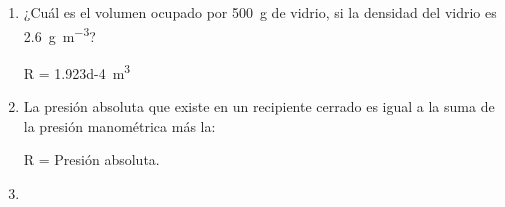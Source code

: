 \documentclass[14pt]{extarticle}
\begin{document}
\begin{enumerate}
R = 1) - c), 2) - b), 3) - d)

\item ¿Cuál es el volumen ocupado por \SI{500}{\gram} de vidrio, si la densidad del vidrio es \SI{2.6}{\gram\per\cubic\metre}?

R = \SI{1.923d-4}{\cubic\meter}

\item La presión absoluta que existe en un recipiente cerrado es igual a la suma de la presión manométrica más la:

R = Presión absoluta.

\item 

\end{enumerate}
\end{document}
